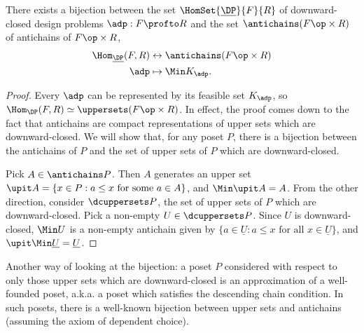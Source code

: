 \begin{lemma}
    There exists a bijection between the set $\HomSet{\underline{\DP}}{F}{R}$ of downward-closed design problems $\adp : F \profto R$ and the set $\antichains (F\op \times R)$ of antichains of $F\op \times R$, %
    \begin{equation}
        \begin{aligned}
            \Hom_{\underline{\DP}}(F,R) &\leftrightarrow \antichains (F\op \times R) \\
            \adp &\mapsto \Min K_\adp.
        \end{aligned}
    \end{equation}
\end{lemma}
\begin{proof}
    Every $\adp$ can be represented by its feasible set $K_\adp$, so $\Hom_\DP(F,R) \simeq \uppersets (F\op \times R)$. In effect, the proof comes down to the fact that antichains are compact representations of upper sets which are downward-closed. We will show that, for any poset $P$, there is a bijection between the antichains of $P$ and the set of upper sets of $P$ which are downward-closed.

    Pick $A \in \antichains P$. Then $A$ generates an upper set $\upit A = \{ x \in P : a \leq x \text{ for some $a \in A$} \}$, and $\Min \upit A = A$. From the other direction, consider $\dcuppersets  P$, the set of upper sets of $P$ which are downward-closed. Pick a non-empty $U \in \dcuppersets  P$. Since $U$ is downward-closed, $\Min U$ is a non-empty antichain given by $\{ a \in \underline{U} : a \leq x \text{ for all $x \in \underline{U}$} \}$, and $\upit \Min \underline{U} = \underline{U}$.
\end{proof}

\begin{remark}
    Another way of looking at the bijection: a poset $P$ considered with respect to only those upper sets which are downward-closed is an approximation of a well-founded poset, a.k.a. a poset which satisfies the descending chain condition. In such posets, there is a well-known bijection between upper sets and antichains (assuming the axiom of dependent choice).
\end{remark}

 

